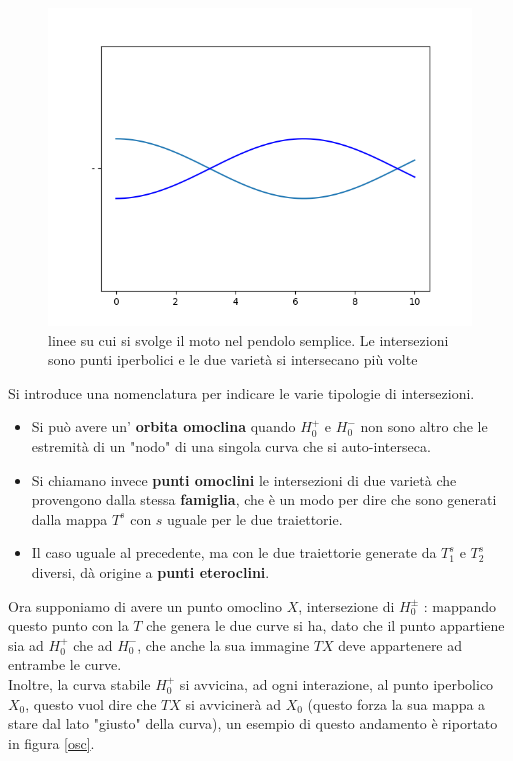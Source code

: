 \documentclass[a4paper,12pt]{article}
\theoremstyle{plain}
\theoremstyle{definition}
\theoremstyle{remark}
\begin{document}
\begin{figure}[h]
\includegraphics[scale=0.5]{Figure_1.png}
\caption{linee su cui si svolge il moto nel pendolo semplice. Le intersezioni sono punti iperbolici e le due varietà si intersecano più volte}
\end{figure}


Si introduce una nomenclatura per indicare le varie tipologie di intersezioni.
\begin{itemize}
	
\item 	Si può avere un' \textbf{orbita omoclina} quando $H_0^+$ e $H_0^-$ non sono altro che le estremità di un "nodo" di una singola curva che si auto-interseca.
	\item Si chiamano invece \textbf{punti omoclini} le intersezioni di due varietà che provengono dalla stessa \textbf{famiglia}, che è un modo per dire che sono generati dalla mappa $T^s$ con $s$ uguale per le due traiettorie.
	\item Il caso uguale al precedente, ma con le due traiettorie generate da $T^s_1$ e $T^s_2$ diversi, dà origine a \textbf{punti eteroclini}.
	
\end{itemize}
Ora supponiamo di avere un punto omoclino $X$, intersezione di $H_0^\pm$ : mappando questo punto con la $T$ che genera le due curve si ha, dato che il punto appartiene sia ad $H_0^+$ che ad $H_0^-$, che anche la sua immagine $TX$ deve appartenere ad entrambe le curve. \\Inoltre, la curva stabile $H_0^+$ si avvicina, ad ogni interazione, al punto iperbolico $X_0$, questo vuol dire che $TX$ si avvicinerà ad $X_0$ (questo forza la sua mappa a stare dal lato "giusto" della curva), un esempio di questo andamento è riportato in figura \ref{osc}.
\end{document}
